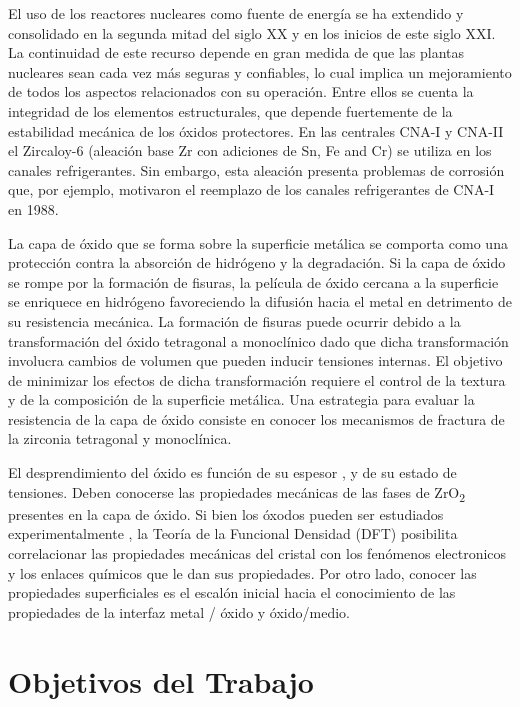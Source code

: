 El uso de los reactores nucleares como fuente de energía se ha extendido y 
consolidado en la segunda mitad del siglo XX y en los inicios de este siglo 
XXI. La continuidad de este recurso depende en gran medida de que las plantas 
nucleares sean cada vez más seguras y confiables, lo cual implica un 
mejoramiento de todos los aspectos relacionados con su operación. Entre ellos 
se cuenta la integridad de los elementos estructurales, que depende fuertemente 
de la estabilidad mecánica de los óxidos protectores. En las centrales CNA-I y 
CNA-II el Zircaloy-6 (aleación base Zr con adiciones de Sn, Fe and Cr) se 
utiliza en los canales refrigerantes\cite{Estevez2000}. Sin embargo, esta 
aleación presenta 
problemas de corrosión que, por ejemplo, motivaron el reemplazo de los canales 
refrigerantes de CNA-I en 1988.

La capa de óxido que se forma sobre la superficie metálica se comporta como una 
protección contra la absorción de hidrógeno y la degradación. Si la capa de 
óxido se rompe por la formación de fisuras, la película de óxido cercana a la 
superficie se enriquece en hidrógeno favoreciendo la difusión hacia el metal en 
detrimento de su resistencia mecánica. La formación de fisuras puede ocurrir 
debido a la transformación del óxido tetragonal a monoclínico dado que dicha 
transformación involucra cambios de volumen que pueden inducir tensiones 
internas. El objetivo de minimizar los efectos de dicha transformación requiere 
el control de la textura y de la composición de la superficie metálica.
Una estrategia para evaluar la resistencia de la capa de óxido consiste en 
conocer los mecanismos de fractura de la zirconia tetragonal y monoclínica. 

El desprendimiento del óxido es función de su espesor \cite{Schutze2005},
y de su estado de tensiones. Deben conocerse las propiedades
mecánicas de las fases de ZrO\textsubscript{2} presentes en la 
capa de óxido. Si bien los óxodos pueden ser estudiados 
experimentalmente , la Teoría de la Funcional Densidad (DFT) 
\cite{KohnSham65,HohenbergKohn64} posibilita correlacionar las
propiedades mecánicas del cristal con los fenómenos electronicos 
y los enlaces químicos que le dan sus propiedades. Por otro lado, conocer
las propiedades superficiales es el escalón inicial hacia el conocimiento
de las propiedades de la interfaz metal / óxido y óxido/medio. 

\section{Objetivos del Trabajo}

